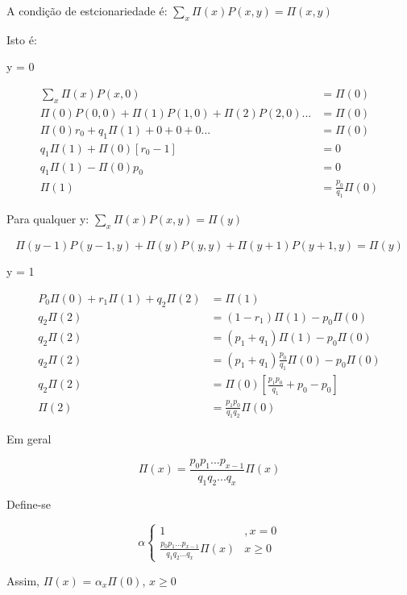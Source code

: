 \documentclass[]{article}
\theoremstyle{definition}
\theoremstyle{definition}
\theoremstyle{definition}
\theoremstyle{remark}
\begin{document}
A condição de estcionariedade é: \(\sum_x \Pi(x) P(x,y)= \Pi(x,y)\)

Isto é:

y = 0

\begin{equation}
\begin{split}
\sum_x \Pi(x)P(x,0) &= \Pi(0)\\
\Pi(0)P(0,0) + \Pi(1) P(1,0) + \Pi(2) P(2,0)... &= \Pi(0)\\
\Pi(0)r_0 + q_1\Pi(1) + 0 + 0 + 0 ... &= \Pi(0)\\
q_1 \Pi(1) + \Pi(0)[r_0 -1] &= 0\\
q_1\Pi(1) - \Pi(0)p_0 &= 0\\
\Pi(1) &= \frac{p_0}{q_1} \Pi(0)
\end{split}
\end{equation}

Para qualquer y: \(\sum_x \Pi(x) P(x,y) = \Pi(y)\)

\[\Pi(y-1)P(y-1,y) + \Pi(y)P(y,y) + \Pi(y+1) P(y+1,y) = \Pi(y)\]

y = 1

\begin{equation}
\begin{split}
P_0 \Pi(0) + r_1 \Pi(1) + q_2 \Pi(2) &= \Pi(1)\\
q_2\Pi(2) &= (1 - r_1) \Pi(1) - p_0\Pi(0)\\
q_2\Pi(2) &= (p_1 + q_1) \Pi(1) - p_0\Pi(0)\\
q_2\Pi(2) &= (p_1 + q_1) \frac{p_0}{q_1} \Pi(0) - p_0\Pi(0)\\
q_2\Pi(2) &= \Pi(0)[\frac{p_1p_0}{q_1} + p_0 - p_0]\\
\Pi(2) &= \frac{p_1 p_0}{q_1 q_2} \Pi(0)
\end{split}
\end{equation}

Em geral

\[\Pi(x) = \frac{p_0 p_1 ... p_{x-1}}{q_1 q_2 ... q_x} \Pi(x)\]

Define-se

\begin{equation}
\alpha\left\{\begin{matrix}
1 &, x = 0 \\
\frac{p_0 p_1 ... p_{x-1}}{q_1 q_2 ... q_x} \Pi(x) &  x \geq 0
\end{matrix}\right.
\end{equation}

Assim, \(\Pi(x)\) = \(\alpha_x \Pi(0)\), \(x \geq 0\)
\end{document}
